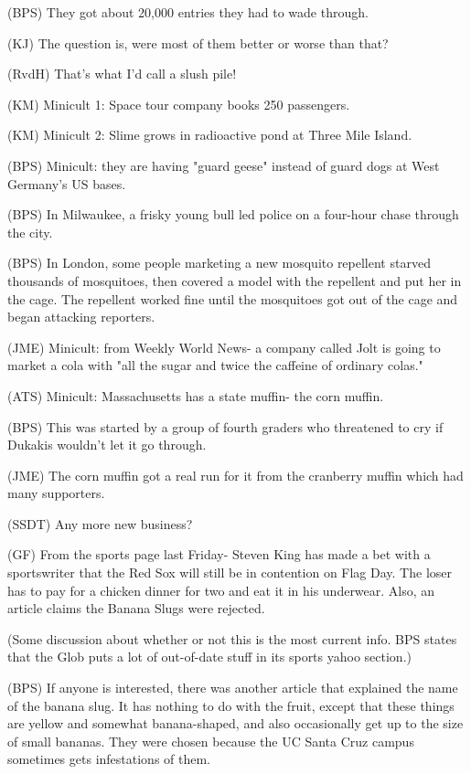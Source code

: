 \documentclass[12pt]{article}
\begin{document}
(BPS) They got about 20,000 entries they had to wade through.

(KJ) The question is, were most of them better or worse than that?

(RvdH) That's what I'd call a slush pile!

(KM) Minicult 1: Space tour company books 250 passengers.

(KM) Minicult 2: Slime grows in radioactive pond at Three Mile Island.

(BPS) Minicult: they are having "guard geese" instead of guard dogs at West Germany's US bases.

(BPS) In Milwaukee, a frisky young bull led police on a four-hour chase through the city.

(BPS) In London, some people marketing a new mosquito repellent starved thousands of mosquitoes, then covered a model with the repellent and put her in the cage. The repellent worked fine until the mosquitoes got out of the cage and began attacking reporters.

(JME) Minicult: from Weekly World News- a company called Jolt is going to market a cola with "all the sugar and twice the caffeine of ordinary colas."

(ATS) Minicult: Massachusetts has a state muffin- the corn muffin.

(BPS) This was started by a group of fourth graders who threatened to cry if Dukakis wouldn't let it go through.

(JME) The corn muffin got a real run for it from the cranberry muffin which had many supporters.

(SSDT) Any more new business?

(GF) From the sports page last Friday- Steven King has made a bet with a sportswriter that the Red Sox will still be in contention on Flag Day. The loser has to pay for a chicken dinner for two and eat it in his underwear. Also, an article claims the Banana Slugs were rejected.

(Some discussion about whether or not this is the most current info. BPS states that the Glob puts a lot of out-of-date stuff in its sports yahoo section.)

(BPS) If anyone is interested, there was another article that explained the name of the banana slug. It has nothing to do with the fruit, except that these things are yellow and somewhat banana-shaped, and also occasionally get up to the size of small bananas. They were chosen because the UC Santa Cruz campus sometimes gets infestations of them.
\end{document}
